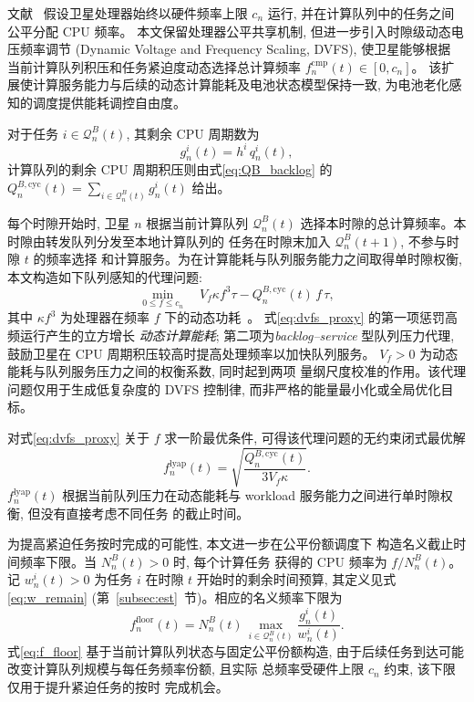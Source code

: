 \documentclass[a4paper,11pt]{article}
\begin{document}
文献~\cite{zhang2024mhspo} 假设卫星处理器始终以硬件频率上限
$c_n$ 运行, 并在计算队列中的任务之间公平分配 CPU 频率。
本文保留处理器公平共享机制, 但进一步引入时隙级动态电压频率调节
(Dynamic Voltage and Frequency Scaling, DVFS), 使卫星能够根据
当前计算队列积压和任务紧迫度动态选择总计算频率
$f^{\mathrm{cmp}}_n(t) \in [0, c_n]$。
该扩展使计算服务能力与后续的动态计算能耗及电池状态模型保持一致,
为电池老化感知的调度提供能耗调控自由度。

对于任务 $i \in \mathcal{Q}^B_n(t)$, 其剩余 CPU 周期数为
\begin{equation}
    g^i_n(t) = h^i\, q^i_n(t),
    \label{eq:remaining_cycles}
\end{equation}
计算队列的剩余 CPU 周期积压则由式\eqref{eq:QB_backlog} 的
$Q^{B,\mathrm{cyc}}_n(t) = \sum_{i \in \mathcal{Q}^B_n(t)} g^i_n(t)$ 给出。

每个时隙开始时, 卫星 $n$ 根据当前计算队列 $\mathcal{Q}^B_n(t)$
选择本时隙的总计算频率。本时隙由转发队列分发至本地计算队列的
任务在时隙末加入 $\mathcal{Q}^B_n(t+1)$, 不参与时隙 $t$ 的频率选择
和计算服务。为在计算能耗与队列服务能力之间取得单时隙权衡,
本文构造如下队列感知的代理问题:
\begin{equation}
    \min_{0 \le f \le c_n}\quad
    V_f \kappa f^3 \tau - Q^{B,\mathrm{cyc}}_n(t)\, f\, \tau,
    \label{eq:dvfs_proxy}
\end{equation}
其中 $\kappa f^3$ 为处理器在频率 $f$ 下的动态功耗~\cite{zhang2024mhspo}。
式\eqref{eq:dvfs_proxy} 的第一项惩罚高频运行产生的立方增长
\emph{动态计算能耗}; 第二项为\emph{backlog--service} 型队列压力代理,
鼓励卫星在 CPU 周期积压较高时提高处理频率以加快队列服务。
$V_f > 0$ 为动态能耗与队列服务压力之间的权衡系数, 同时起到两项
量纲尺度校准的作用。该代理问题仅用于生成低复杂度的 DVFS 控制律,
而非严格的能量最小化或全局优化目标。

对式\eqref{eq:dvfs_proxy} 关于 $f$ 求一阶最优条件,
可得该代理问题的无约束闭式最优解
\begin{equation}
    f^{\mathrm{lyap}}_n(t) =
    \sqrt{\frac{Q^{B,\mathrm{cyc}}_n(t)}{3 V_f \kappa}}.
    \label{eq:f_lyap}
\end{equation}
$f^{\mathrm{lyap}}_n(t)$ 根据当前队列压力在动态能耗与
workload 服务能力之间进行单时隙权衡, 但没有直接考虑不同任务
的截止时间。

为提高紧迫任务按时完成的可能性, 本文进一步在公平份额调度下
构造名义截止时间频率下限。当 $N^B_n(t) > 0$ 时, 每个计算任务
获得的 CPU 频率为 $f / N^B_n(t)$。记 $w^i_n(t) > 0$ 为任务 $i$
在时隙 $t$ 开始时的剩余时间预算, 其定义见式\eqref{eq:w_remain}
(第~\ref{subsec:est}~节)。相应的名义频率下限为
\begin{equation}
    f^{\mathrm{floor}}_n(t) =
    N^B_n(t)\, \max_{i \in \mathcal{Q}^B_n(t)} \frac{g^i_n(t)}{w^i_n(t)}.
    \label{eq:f_floor}
\end{equation}
式\eqref{eq:f_floor} 基于当前计算队列状态与固定公平份额构造,
由于后续任务到达可能改变计算队列规模与每任务频率份额, 且实际
总频率受硬件上限 $c_n$ 约束, 该下限仅用于提升紧迫任务的按时
完成机会。
\end{document}
